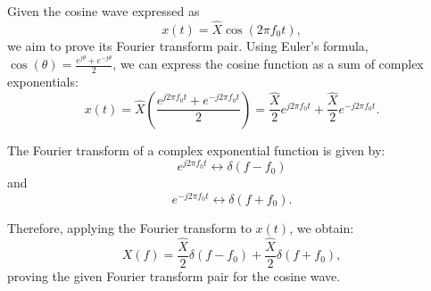 
\item [a)]
Given the cosine wave expressed as
$$
x(t) = \hat{X} \cos(2\pi f_0 t),
$$
we aim to prove its Fourier transform pair. Using Euler's formula, $\cos(\theta) = \frac{e^{j\theta} + e^{-j\theta}}{2}$, we can express the cosine function as a sum of complex exponentials:
$$
x(t) = \hat{X} \left( \frac{e^{j2\pi f_0 t} + e^{-j2\pi f_0 t}}{2} \right) = \frac{\hat{X}}{2} e^{j2\pi f_0 t} + \frac{\hat{X}}{2} e^{-j2\pi f_0 t}.
$$

The Fourier transform of a complex exponential function is given by:
$$
e^{j2\pi f_0 t} \leftrightarrow \delta(f-f_0)
$$
and
$$
e^{-j2\pi f_0 t} \leftrightarrow \delta(f+f_0).
$$

Therefore, applying the Fourier transform to $x(t)$, we obtain:
$$
X(f) = \frac{\hat{X}}{2} \delta(f-f_0) + \frac{\hat{X}}{2} \delta(f+f_0),
$$
proving the given Fourier transform pair for the cosine wave.

